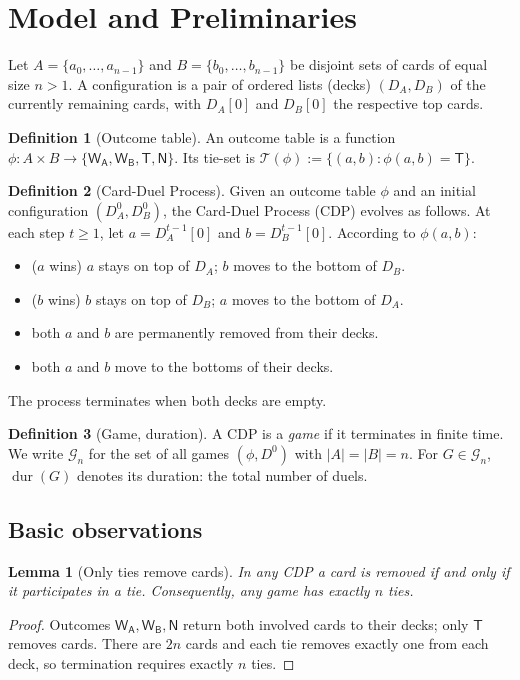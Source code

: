 \documentclass[11pt]{article}
\newtheorem{lemma}{Lemma}
\theoremstyle{definition}
\newtheorem{definition}{Definition}
\theoremstyle{remark}
\DeclareMathOperator{\dur}{dur}
\newcommand{\WA}{\mathsf{W_A}}
\newcommand{\WB}{\mathsf{W_B}}
\newcommand{\TT}{\mathsf{T}}
\newcommand{\NN}{\mathsf{N}}
\newcommand{\Tphi}{\mathcal{T}}
\begin{document}
\section{Model and Preliminaries}\label{sec:model}
Let $A = \{a_0, \dots, a_{n-1}\}$ and $B = \{b_0, \dots, b_{n-1}\}$ be disjoint sets of cards of equal size $n > 1$. A
configuration is a pair of ordered lists (decks) $(D_A, D_B)$ of the currently remaining cards, with $D_A[0]$
and $D_B[0]$ the respective top cards.

\begin{definition}[Outcome table]
An outcome table is a function $\phi : A \times B \to \{\WA, \WB, \TT, \NN\}$. Its tie-set is
$\Tphi(\phi) := \{(a, b) : \phi(a, b) = \TT\}$.
\end{definition}

\begin{definition}[Card-Duel Process]
Given an outcome table $\phi$ and an initial configuration $(D^0_A, D^0_B)$, the Card-Duel Process (CDP) evolves as
follows. At each step $t \ge 1$, let $a = D^{t-1}_A[0]$ and $b = D^{t-1}_B[0]$. According to $\phi(a, b)$:
\begin{itemize}[leftmargin=2.2em,nosep]
\item[$\WA$:] ($a$ wins) $a$ stays on top of $D_A$; $b$ moves to the bottom of $D_B$.
\item[$\WB$:] ($b$ wins) $b$ stays on top of $D_B$; $a$ moves to the bottom of $D_A$.
\item[$\TT$:] both $a$ and $b$ are permanently removed from their decks.
\item[$\NN$:] both $a$ and $b$ move to the bottoms of their decks.
\end{itemize}
The process terminates when both decks are empty.
\end{definition}

\begin{definition}[Game, duration]
A CDP is a \emph{game} if it terminates in finite time. We write $\mathcal G_n$ for the set of all games $(\phi, D^0)$
with $|A| = |B| = n$. For $G \in \mathcal G_n$, $\dur(G)$ denotes its duration: the total number of duels.
\end{definition}

\subsection{Basic observations}
\begin{lemma}[Only ties remove cards]\label{lem:ties}
In any CDP a card is removed if and only if it participates in a tie. Consequently, any game has exactly $n$ ties.
\end{lemma}
\begin{proof}
Outcomes $\WA, \WB, \NN$ return both involved cards to their decks; only $\TT$ removes cards. There are $2n$ cards and
each tie removes exactly one from each deck, so termination requires exactly $n$ ties.
\end{proof}
\end{document}
